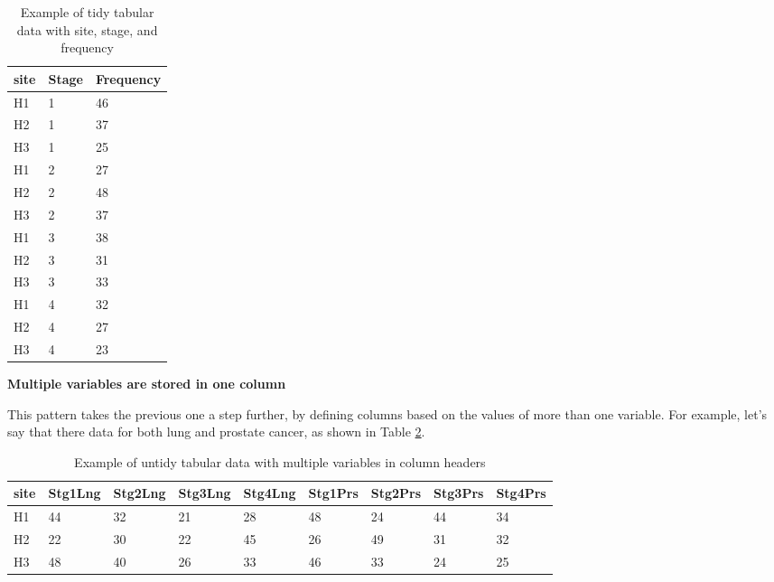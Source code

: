 \bigskip\noindent
\begin{table}[!htbp]
\centering
\begin{tabular}{p{}p{}p{}}
\toprule
site & Stage & Frequency \\
\hline
H1 & 1 & 46 \\
H2 & 1 & 37 \\
H3 & 1 & 25 \\
H1 & 2 & 27 \\
H2 & 2 & 48 \\
H3 & 2 & 37 \\
H1 & 3 & 38 \\
H2 & 3 & 31 \\
H3 & 3 & 33 \\
H1 & 4 & 32 \\
H2 & 4 & 27 \\
H3 & 4 & 23 \\
\bottomrule
\end{tabular}
\caption{Example of tidy tabular data with site, stage, and frequency}
\label{tidy-data-table}
\end{table}

\bigskip

\textbf{Multiple variables are stored in one column}

This pattern takes the previous one a step further, by defining columns based on the values of more than one variable.  For example, let's say that there data for both lung and prostate cancer, as shown in Table \ref{untidy-multiple-variables-table}.

\bigskip\noindent
\begin{table}[!htbp]
\centering
\begin{tabular}{p{}p{}p{}p{}p{}p{}p{}p{}p{}}
\toprule
site & Stg1Lng & Stg2Lng & Stg3Lng & Stg4Lng & Stg1Prs & Stg2Prs & Stg3Prs & Stg4Prs \\
\hline
H1 & 44 & 32 & 21 & 28 & 48 & 24 & 44 & 34 \\
H2 & 22 & 30 & 22 & 45 & 26 & 49 & 31 & 32 \\
H3 & 48 & 40 & 26 & 33 & 46 & 33 & 24 & 25 \\
\bottomrule
\end{tabular}
\caption{Example of untidy tabular data with multiple variables in column headers}
\label{untidy-multiple-variables-table}
\end{table}

